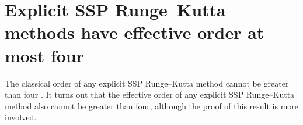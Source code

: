 \section{Explicit SSP Runge--Kutta methods have effective order at most four}\label{sec:ExRK_barrier}
The classical order of any explicit SSP Runge--Kutta method cannot be greater
than four \cite{Ruuth2002}.
It turns out that the effective order of any explicit SSP Runge--Kutta method 
also cannot be greater than four, although the proof of this result is more
involved.
%
%
